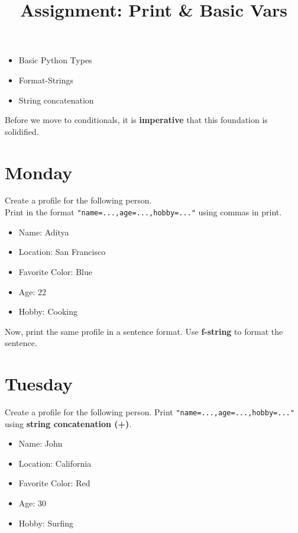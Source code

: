 \documentclass{article}
\title{\vspace{-3em}Assignment: Print \& Basic Vars\vspace{-3em}}
\begin{document}
\fontsize{14}{16}\selectfont
\maketitle
\vspace{-1em}

\begin{itemize}
    \item Basic Python Types
    \item Format-Strings
    \item String concatenation
\end{itemize}

Before we move to conditionals, it is \textbf{imperative} that this foundation is solidified.

\section{Monday}

Create a profile for the following person. \\
Print in the format \verb|"name=...,age=...,hobby=..."| using commas in print. \\ 

\begin{itemize}
    \item Name: Aditya
    \item Location: San Francisco
    \item Favorite Color: Blue
    \item Age: 22
    \item Hobby: Cooking
\end{itemize}

Now, print the same profile in a sentence format. Use \textbf{f-string} to format the sentence.

\section{Tuesday}

Create a profile for the following person. Print \verb|"name=...,age=...,hobby=..."| using \textbf{string concatenation (+)}.

\begin{itemize}
    \item Name: John
    \item Location: California
    \item Favorite Color: Red
    \item Age: 30
    \item Hobby: Surfing
\end{itemize}
\end{document}
